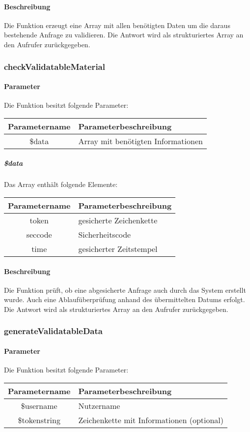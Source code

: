 \paragraph{Beschreibung} Die Funktion erzeugt eine Array mit allen benötigten Daten um die daraus bestehende Anfrage zu validieren. Die Antwort wird als strukturiertes Array an den Aufrufer zurückgegeben.
\subsubsection{checkValidatableMaterial}
\paragraph{Parameter} Die Funktion besitzt folgende Parameter:
\begin{table}[H]
	\begin{tabular}{|c|p{11cm}|}
		\hline
		\textbf{Parametername} & \textbf{Parameterbeschreibung} \\ \hline
		\$data & Array mit benötigten Informationen \\ \hline
	\end{tabular}
\end{table}
\subparagraph{\$data} Das Array enthält folgende Elemente:
\begin{table}[H]
	\begin{tabular}{|c|p{11cm}|}
		\hline
		\textbf{Parametername} & \textbf{Parameterbeschreibung} \\ \hline
		token   & gesicherte Zeichenkette \\ \hline
		seccode & Sicherheitscode \\ \hline
		time    & gesicherter Zeitstempel \\ \hline
	\end{tabular}
\end{table}
\paragraph{Beschreibung} Die Funktion prüft, ob eine abgesicherte Anfrage auch durch das System erstellt wurde. Auch eine Ablaufüberprüfung anhand des übermittelten Datums erfolgt. Die Antwort wird als strukturiertes Array an den Aufrufer zurückgegeben.
\subsubsection{generateValidatableData}
\paragraph{Parameter} Die Funktion besitzt folgende Parameter:
\begin{table}[H]
	\begin{tabular}{|c|p{11cm}|}
		\hline
		\textbf{Parametername} & \textbf{Parameterbeschreibung} \\ \hline
		\$username    & Nutzername \\ \hline
		\$tokenstring & Zeichenkette mit Informationen (optional) \\ \hline
	\end{tabular}
\end{table}
